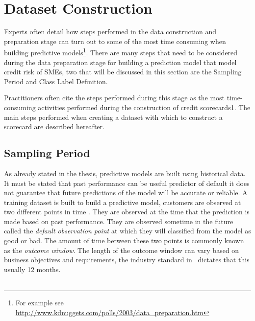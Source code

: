 \section{Dataset Construction}\label{sec:datasetConstruction}

Experts often detail how steps performed in the data construction and preparation stage can turn out to some of the most time consuming  when building predictive models\footnote{For example see \url{http://www.kdnuggets.com/polls/2003/data_preparation.htm}}. There are many steps that need to be considered during the data preparation stage for building a prediction model that model credit risk of SMEs, two that will be discussed in this section are the Sampling Period and Class Label Definition. 

Practitioners often cite the steps performed during this stage as the most time-consuming
activities performed during the construction of credit scorecards1. The
main steps performed when creating a dataset with which to construct a scorecard
are described hereafter.

\subsection{Sampling Period}
As already stated in the thesis, predictive models are built using historical data. It must be stated that past performance can be useful predictor of default it does not guarantee that future predictions of the model will be accurate or reliable. A training dataset is built to build a predictive model, customers are observed at two different points in time \citep{martens_credit_2010}. They are observed at the time that the prediction is made based on past performance. They are observed sometime in the future called the \textit{default observation point} at which they will classified from the model as good or bad. The amount of time between these two points is commonly known as the \textit{outcome window}. The length of the outcome window can vary based on business objectives and requirements, the industry standard in \subjectname\ dictates that this usually 12 months. \\\\


